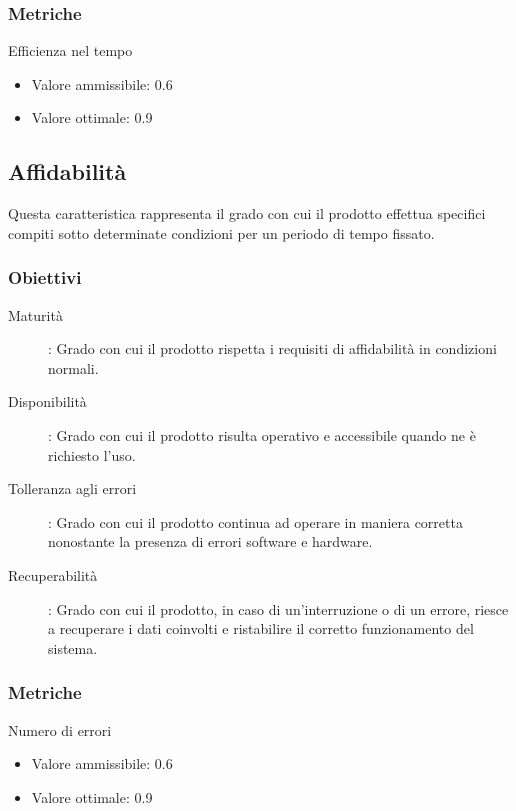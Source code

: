 \documentclass[../piano-di-qualifica.tex]{subfiles}
\begin{document}
\subsubsection{Metriche}%
\label{subs:metriche}
\item [Efficienza nel tempo]
    \begin{itemize} \item Valore ammissibile: 0.6 \item Valore ottimale: 0.9 \end{itemize}


\subsection{Affidabilità}%
\label{sub:affidabilita}
 Questa caratteristica rappresenta il grado con cui il prodotto effettua specifici compiti sotto determinate condizioni per un periodo di tempo fissato.
\subsubsection{Obiettivi}%
\label{subs:obiettivi}
      \begin{description}
        \item [Maturità]: Grado con cui il prodotto rispetta i requisiti di affidabilità in condizioni normali.
        \item [Disponibilità]: Grado con cui il prodotto risulta operativo e accessibile quando ne è richiesto l'uso.
        \item [Tolleranza agli errori]: Grado con cui il prodotto continua ad operare in maniera corretta nonostante la presenza di errori software e hardware.
        \item [Recuperabilità]: Grado con cui il prodotto, in caso di un'interruzione o di un errore, riesce a recuperare i dati coinvolti e ristabilire il corretto funzionamento del sistema.
      \end{description}

\subsubsection{Metriche}%
\label{subs:metriche}
\item [Numero di errori]
    \begin{itemize} \item Valore ammissibile: 0.6 \item Valore ottimale: 0.9 \end{itemize}
\end{document}
